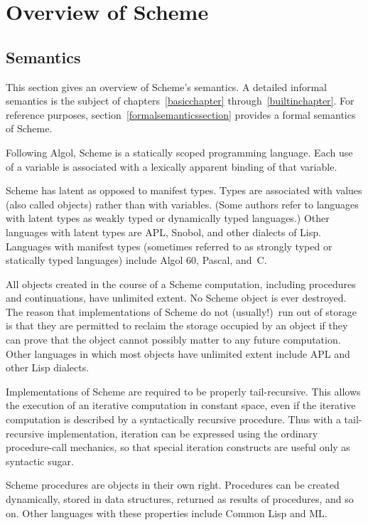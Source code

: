 
\chapter{Overview of Scheme}

\section{Semantics}
\label{semanticsection}

This section gives an overview of Scheme's semantics.  A
detailed informal semantics is the subject of
chapters~\ref{basicchapter} through~\ref{builtinchapter}.  For reference
purposes, section~\ref{formalsemanticssection} provides a formal
semantics of Scheme.

\vest Following Algol, Scheme is a statically scoped programming
language.  Each use of a variable is associated with a lexically
apparent binding of that variable.

\vest Scheme has latent as opposed to manifest types.  Types
are associated with values (also called objects) rather than with
variables.  (Some authors refer to languages with latent types as
weakly typed or dynamically typed languages.)  Other languages with
latent types are APL, Snobol, and other dialects of Lisp.  Languages
with manifest types (sometimes referred to as strongly typed or
statically typed languages) include Algol 60, Pascal, and~C.

\vest All objects created in the course of a Scheme computation, including
procedures and continuations, have unlimited extent.
No Scheme object is ever destroyed.  The reason that
implementations of Scheme do not (usually!)\ run out of storage is that
they are permitted to reclaim the storage occupied by an object if
they can prove that the object cannot possibly matter to any future
computation.  Other languages in which most objects have unlimited
extent include APL and other Lisp dialects.

\vest Implementations of Scheme are required to be properly tail-recursive.
This allows the execution of an iterative computation in constant space,
even if the iterative computation is described by a syntactically
recursive procedure.  Thus with a tail-recursive implementation,
iteration can be expressed using the ordinary procedure-call
mechanics, so that special iteration constructs are useful only as
syntactic sugar.

\vest Scheme procedures are objects in their own right.  Procedures can be
created dynamically, stored in data structures, returned as results of
procedures, and so on.  Other languages with these properties include
Common Lisp and ML. 

